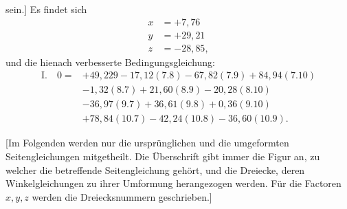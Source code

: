 sein.] Es findet sich
\[
\begin{aligned}
x&=+7{,}76\\
y&=+29{,}21\\
z&=-28{,}85,
\end{aligned}
\]
und die hienach verbesserte Bedingungsgleichung:
\[
\begin{aligned}
\mathrm{I.}\quad 0={}&+49{,}229-17{,}12(7.8)-67{,}82(7.9)+84{,}94(7.10)\\
&-1{,}32(8.7)+21{,}60(8.9)-20{,}28(8.10)\\
&-36{,}97(9.7)+36{,}61(9.8)+0{,}36(9.10)\\
&+78{,}84(10.7)-42{,}24(10.8)-36{,}60(10.9).
\end{aligned}
\]

[Im Folgenden werden nur die ursprünglichen und die umgeformten
Seitengleichungen mitgetheilt. Die Überschrift gibt immer die Figur an, zu
welcher die betreffende Seitengleichung gehört, und die Dreiecke, deren
Winkelgleichungen zu ihrer Umformung herangezogen werden. Für die Factoren
$x,y,z$ werden die Dreiecksnummern geschrieben.]
